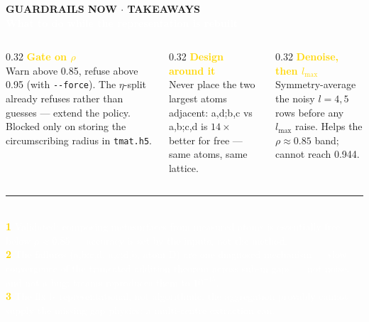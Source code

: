 \documentclass[10pt,aspectratio=169]{beamer}
\begin{document}
{
\begin{frame}[plain]
  \vspace{0.8cm}
  {\footnotesize\bfseries\textcolor{white!70!navy}{GUARDRAILS NOW  $\cdot$  TAKEAWAYS}}\\[1ex]
  {\Large\bfseries\textcolor{white}{What to do while the representation is rebuilt}}\\[3ex]
  \begin{columns}[t]
    \begin{column}{0.32\textwidth}
      {\textcolor{gold}{\textbf{Gate on $\rho$}}}\\[0.5ex]
      {\footnotesize\textcolor{white!85!navy}{Warn above 0.85, refuse above 0.95 (with \texttt{-{}-force}).
      The $\eta$-split already refuses rather than guesses --- extend the policy.
      Blocked only on storing the circumscribing radius in \texttt{tmat.h5}.}}
    \end{column}
    \begin{column}{0.32\textwidth}
      {\textcolor{gold}{\textbf{Design around it}}}\\[0.5ex]
      {\footnotesize\textcolor{white!85!navy}{Never place the two largest atoms adjacent:
      a,d;b,c vs a,b;c,d is $14\times$ better for free --- same atoms, same lattice.}}
    \end{column}
    \begin{column}{0.32\textwidth}
      {\textcolor{gold}{\textbf{Denoise, then $l_{\max}$}}}\\[0.5ex]
      {\footnotesize\textcolor{white!85!navy}{Symmetry-average the noisy $l = 4,5$ rows before any
      $l_{\max}$ raise. Helps the $\rho \approx 0.85$ band; cannot reach 0.944.}}
    \end{column}
  \end{columns}
  \vspace{3ex}
  {\color{white!30!navy}\rule{\textwidth}{0.5pt}}\\[1.5ex]
  {\small\textcolor{white}{%
  \textcolor{gold}{\textbf{1}}\; Validated: composing metasurfaces from measured atoms is essentially free below $\rho \approx 0.85$ --- accuracy is set by the inputs, not the method.\\[0.8ex]
  \textcolor{gold}{\textbf{2}}\; The failures (a,b;c,d, a,c;d,b, atom D) are one diagnosed mechanism --- slow convergence of the truncated addition theorem across sub-\textmu m gaps --- not noise, and not a bug: treams reproduces them to $10^{-15}$.\\[0.8ex]
  \textcolor{gold}{\textbf{3}}\; The fix is representational, not algorithmic: the aggregation provably cannot supply the missing gap physics; a multi-centre extraction can.}}
\end{frame}}
\end{document}
